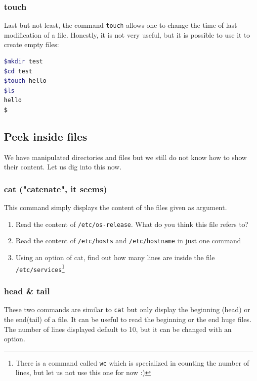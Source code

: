 \documentclass[12pt]{article}
\begin{document}
\subsubsection{touch}

Last but not least, the command \texttt{touch} allows one to change the time of last modification of a file. Honestly, it is not very useful, but it is possible to use it to create empty files:

\begin{lstlisting}[language=bash]
$mkdir test
$cd test
$touch hello
$ls
hello
$
\end{lstlisting}


\subsection{Peek inside files}

We have manipulated directories and files but we still do not know how to show their content. Let us dig into this now.

\subsubsection{cat ("catenate", it seems)}

This command simply displays the content of the files given as argument.

\begin{enumerate}
\item Read the content of \texttt{/etc/os-release}. What do you think this file refers to?
\item Read the content of \texttt{/etc/hosts} and \texttt{/etc/hostname} in just one command
\item Using an option of cat, find out how many lines are inside the file \texttt{/etc/services}\footnote{There is a command called \texttt{wc} which is specialized in counting the number of lines, but let us not use this one for now :)}
\end{enumerate}

\subsubsection{head \& tail}

These two commands are similar to \texttt{cat} but only display the beginning (head) or the end(tail) of a file. It can be useful to read the beginning or the end huge files.
The number of lines displayed default to 10, but it can be changed with an option. 
\end{document}
